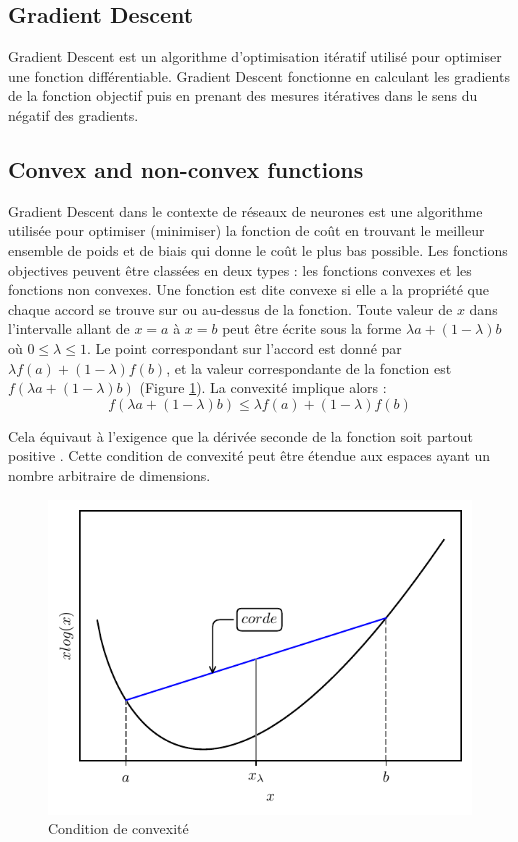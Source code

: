\subsection{Gradient Descent}
Gradient Descent est un algorithme d'optimisation itératif utilisé pour optimiser une fonction différentiable. Gradient Descent fonctionne en calculant les gradients de la fonction objectif puis en prenant des mesures itératives dans le sens du négatif des gradients.

\subsection{Convex and non-convex functions}

Gradient Descent dans le contexte de réseaux de neurones est une algorithme utilisée pour optimiser (minimiser) la fonction de coût en trouvant le meilleur ensemble de poids et de biais qui donne le coût le plus bas possible. Les fonctions objectives peuvent être classées en deux types : les fonctions convexes et les fonctions non convexes.
Une fonction est dite convexe si elle a la propriété que chaque accord se trouve sur ou au-dessus de la fonction. Toute valeur de $x$ dans l'intervalle allant de $x=a$ à $x=b$ peut être écrite sous la forme $\lambda a+(1-\lambda)b$ où $0\leq\lambda\leq 1$. Le point correspondant sur l'accord est donné par $\lambda f(a)+(1-\lambda)f(b)$, et la valeur correspondante de la fonction est $f(\lambda a+(1-\lambda)b)$ (Figure \ref{fig:convexity}). La convexité implique alors :
\begin{equation}
    f(\lambda a+(1-\lambda)b)\leq \lambda f(a)+(1-\lambda)f(b)
    \label{equation:convexity}
\end{equation}

Cela équivaut à l'exigence que la dérivée seconde de la fonction soit partout positive \cite{Bishop2006}. Cette condition de convexité peut être étendue aux espaces ayant un nombre arbitraire de dimensions.

\begin{figure}[h]
    \centering
    \includegraphics{figures/convex_function_fr.pdf}
    \caption{Condition de convexité}
    \label{fig:convexity}
\end{figure}

